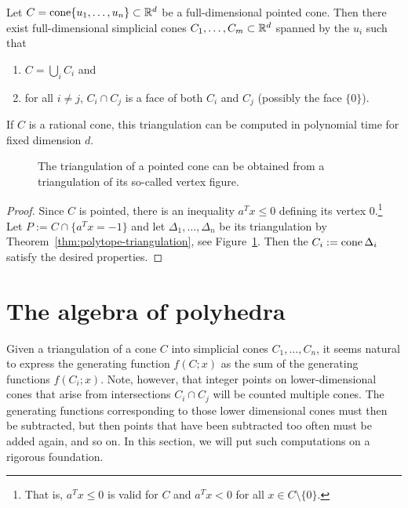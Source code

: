 \begin{corollary}
  Let $C = \operatorname{cone}\{ u_1, \ldots, u_n \} \subset \mathbb{R}^d$ be a full-dimensional pointed cone.
  Then there exist full-dimensional simplicial cones $C_1, \ldots, C_m \subset \mathbb{R}^d$ spanned by the $u_i$
  such that
  \begin{enumerate}
    \item $C = \bigcup_i C_i$ and
    \item for all $i \neq j$, $C_i \cap C_j$ is a face of both $C_i$ and $C_j$ (possibly the face $\{ 0 \}$).
  \end{enumerate}
  If $C$ is a rational cone, this triangulation can be computed in polynomial time for fixed dimension $d$.
\end{corollary}
\begin{figure}
  \begin{center}
  \end{center}
  \caption{The triangulation of a pointed cone can be obtained from a triangulation of its so-called vertex figure.}
  \label{fig:triangulation-cone}
\end{figure}
\begin{proof}
  Since $C$ is pointed,
  there is an inequality $a^T x \leq 0$ defining its vertex $0$.\footnote{%
  That is, $a^Tx \leq 0$ is valid for $C$ and $a^Tx < 0$ for all $x \in C \setminus \{ 0 \}$.}
  Let $P := C \cap \{ a^Tx = -1 \}$
  and let $\Delta_1, \ldots, \Delta_n$ be its triangulation by Theorem~\ref{thm:polytope-triangulation},
  see Figure~\ref{fig:triangulation-cone}.
  Then the $C_i := \operatorname{cone} \Delta_i$ satisfy the desired properties.
\end{proof}




\section{The algebra of polyhedra}

Given a triangulation of a cone $C$ into simplicial cones $C_1, \ldots, C_n$,
it seems natural to express the generating function $f(C;x)$ as
the sum of the generating functions $f(C_i;x)$.
Note, however, that integer points on lower-dimensional cones that arise from intersections $C_i \cap C_j$
will be counted multiple cones.
The generating functions corresponding to those lower dimensional cones must then be subtracted,
but then points that have been subtracted too often must be added again, and so on.
In this section, we will put such computations on a rigorous foundation.

